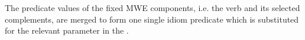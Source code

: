 \documentclass[output=paper]{langsci/langscibook}
\begin{document}
\ili{}\z\ili{}
\ili{}
\ili{}%
\ili{}
\ili{}%
\ili{}%
\ili{}%
\ili{}%
\ili{}%
\ili{}%
\ili{}%
\ili{}%
\ili{}
The\ili{} predicate\ili{} values\ili{} of\ili{} the\ili{} fixed\ili{} MWE\ili{} components\ili{},\ili{} i\ili{}.e\ili{}.\ili{} the\ili{} verb\ili{} and\ili{} its\ili{} selected\ili{} complements\ili{},\ili{} are\ili{} merged\ili{} to\ili{} form\ili{} one\ili{} single\ili{} idiom\ili{} predicate\ili{} which\ili{} is\ili{} substituted\ili{} for\ili{} the\ili{} relevant\ili{} parameter\ili{} in\ili{} the\ili{} \ili{}\isi{}\ili{}.\ili{}
\end{document}
